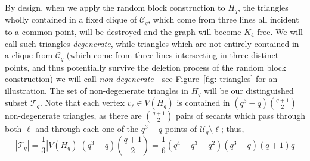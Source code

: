 \documentclass[A4paper,reqno,oneside,12pt]{amsart}
\theoremstyle{plain}
\theoremstyle{definition}
\newcommand{\scC}{\mathscr{C}}
\newcommand{\scT}{\mathscr{T}}
\newcommand{\scU}{\mathscr{U}}
\def\l{\ell}
\begin{document}
By design, when we apply the random block construction to $H_q$, the triangles wholly contained in a fixed clique of $\scC_q$, which come from three lines all incident to a common point, will be destroyed and the graph will become $K_4$-free. 
We will call such triangles {\it degenerate}, while triangles which are not entirely contained in a clique from $\scC_q$ (which come from three lines intersecting in three distinct points, and thus potentially survive the deletion process of the random block construction) we will call {\it non-degenerate}---see Figure~\ref{fig: triangles} for an illustration.
The set of non-degenerate triangles in $H_q$ will be our distinguished subset $\scT_q$.
Note that each vertex $v_\l \in V(H_q)$ is contained in $(q^3-q)\binom{q+1}{2}$ non-degenerate triangles, as there are $\binom{q+1}{2}$ pairs of secants which pass through both $\l$ and through each one of the $q^3-q$ points of $\scU_q \setminus \l$;
thus,
\begin{equation}
\label{eqn: non-degenerate triangles}
    |\scT_q| = \frac{1}{3}|V(H_q)|(q^3-q)\binom{q+1}{2} = \frac{1}{6} (q^4-q^3+q^2)(q^3-q)(q+1)q
\end{equation}
\end{document}
